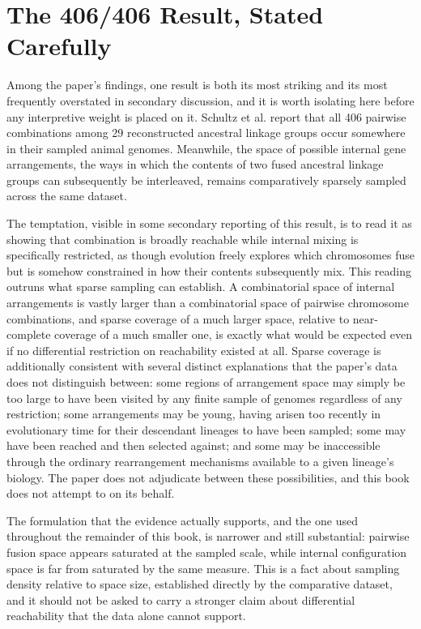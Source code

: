 \documentclass[11pt]{book}
\begin{document}
\section{The 406/406 Result, Stated Carefully}

Among the paper's findings, one result is both its most striking and its most frequently overstated in secondary discussion, and it is worth isolating here before any interpretive weight is placed on it. Schultz et al. report that all 406 pairwise combinations among 29 reconstructed ancestral linkage groups occur somewhere in their sampled animal genomes. Meanwhile, the space of possible internal gene arrangements, the ways in which the contents of two fused ancestral linkage groups can subsequently be interleaved, remains comparatively sparsely sampled across the same dataset.

The temptation, visible in some secondary reporting of this result, is to read it as showing that combination is broadly reachable while internal mixing is specifically restricted, as though evolution freely explores which chromosomes fuse but is somehow constrained in how their contents subsequently mix. This reading outruns what sparse sampling can establish. A combinatorial space of internal arrangements is vastly larger than a combinatorial space of pairwise chromosome combinations, and sparse coverage of a much larger space, relative to near-complete coverage of a much smaller one, is exactly what would be expected even if no differential restriction on reachability existed at all. Sparse coverage is additionally consistent with several distinct explanations that the paper's data does not distinguish between: some regions of arrangement space may simply be too large to have been visited by any finite sample of genomes regardless of any restriction; some arrangements may be young, having arisen too recently in evolutionary time for their descendant lineages to have been sampled; some may have been reached and then selected against; and some may be inaccessible through the ordinary rearrangement mechanisms available to a given lineage's biology. The paper does not adjudicate between these possibilities, and this book does not attempt to on its behalf.

The formulation that the evidence actually supports, and the one used throughout the remainder of this book, is narrower and still substantial: pairwise fusion space appears saturated at the sampled scale, while internal configuration space is far from saturated by the same measure. This is a fact about sampling density relative to space size, established directly by the comparative dataset, and it should not be asked to carry a stronger claim about differential reachability that the data alone cannot support.
\end{document}
